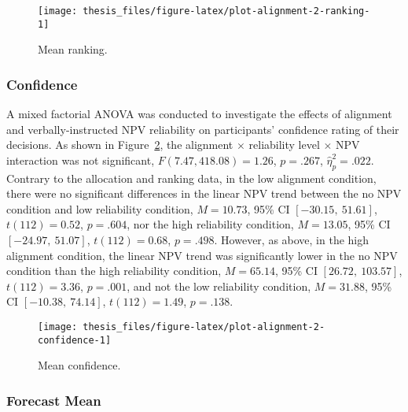\documentclass[a4paper, nobind]{templates/ociamthesis}
\theoremstyle{definition}
\theoremstyle{definition}
\theoremstyle{definition}
\theoremstyle{definition}
\theoremstyle{remark}
\begin{document}
\begin{figure}
\texttt{[image: thesis\_files/figure-latex/plot-alignment-2-ranking-1]} \caption{Mean ranking.}\label{fig:plot-alignment-2-ranking}
\end{figure}

\subsubsection{Confidence}

A mixed factorial ANOVA was conducted to investigate the effects of alignment
and verbally-instructed NPV reliability on participants' confidence rating of
their decisions. As shown in Figure~\ref{fig:plot-alignment-2-confidence}, the
alignment \(\times\) reliability level \(\times\) NPV interaction was not
significant,
\(F(7.47, 418.08) = 1.26\), \(p = .267\), \(\hat{\eta}^2_p = .022\).
Contrary to the allocation and ranking data, in
the low alignment condition, there were no significant differences in the linear
NPV trend between the no NPV condition and low reliability condition,
\(M = 10.73\), 95\% CI \([-30.15,~51.61]\), \(t(112) = 0.52\), \(p = .604\), nor the high
reliability condition, \(M = 13.05\), 95\% CI \([-24.97,~51.07]\), \(t(112) = 0.68\), \(p = .498\).
However, as above, in the high alignment condition, the linear NPV trend was
significantly lower in the no NPV condition than the high reliability condition,
\(M = 65.14\), 95\% CI \([26.72,~103.57]\), \(t(112) = 3.36\), \(p = .001\), and not the low
reliability condition, \(M = 31.88\), 95\% CI \([-10.38,~74.14]\), \(t(112) = 1.49\), \(p = .138\).



\begin{figure}
\texttt{[image: thesis\_files/figure-latex/plot-alignment-2-confidence-1]} \caption{Mean confidence.}\label{fig:plot-alignment-2-confidence}
\end{figure}

\subsubsection{Forecast Mean}
\end{document}
